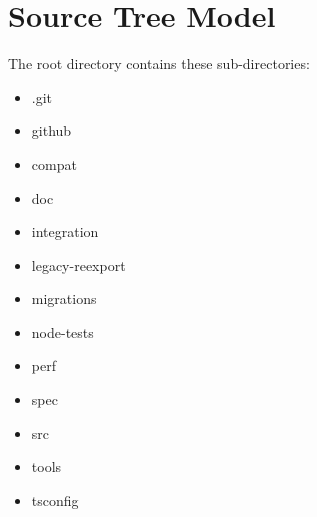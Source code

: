\section{Source Tree Model}

The root directory contains these sub-directories:

\begin{itemize}
  \item .git
  \item github
  \item compat
  \item doc
  \item integration
  \item legacy-reexport
  \item migrations
  \item node-tests
  \item perf
  \item spec
  \item src
  \item tools
  \item tsconfig
\end{itemize}


